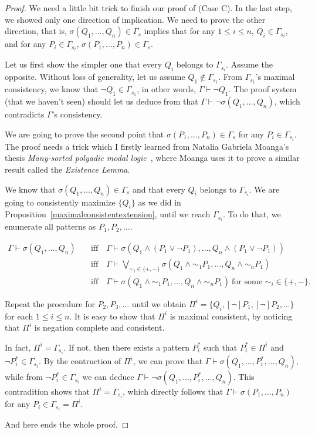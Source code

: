 \documentclass{article}
\theoremstyle{plain}
\begin{document}
\begin{proof}
We need a little bit trick to finish our proof of (Case C). In the last step, we showed only one direction of implication. We need to prove the other direction, that is, $\sigma(Q_1,\dots,Q_n) \in \Gamma_s$ implies that for any $1 \le i \le n$, $Q_i \in \Gamma_{s_i}$, and for any $P_i \in \Gamma_{s_i}$, $\sigma(P_1, \dots, P_n) \in \Gamma_s$.

Let us first show the simpler one that every $Q_i$ belongs to $\Gamma_{s_i}$. Assume the opposite. Without loss of generality, let us assume $Q_1 \not \in \Gamma_{s_1}$. From $\Gamma_{s_1}$'s maximal consistency, we know that $\neg Q_1 \in \Gamma_{s_1}$, in other words, $\Gamma \vdash \neg Q_1$. The proof system (that we haven't seen) should let us deduce from that $\Gamma \vdash \neg \sigma(Q_1,\dots, Q_n)$, which contradicts $\Gamma$'s consistency.

We are going to prove the second point that $\sigma(P_1,\dots,P_n) \in \Gamma_s$ for any $P_i \in \Gamma_{s_i}$. The proof needs a trick which I firstly learned from Natalia Gabriela Moanga's thesis \emph{Many-sorted polyadic modal logic}~\cite{}, where Moanga uses it to prove a similar result called the \emph{Existence Lemma}.

We know that $\sigma(Q_1,\dots,Q_n) \in \Gamma_s$ and that every $Q_i$ belongs to $\Gamma_{s_i}$. We are going to consistently maximize $\{Q_i\}$ as we did in Proposition~\ref{maximalconsistentextension}, until we reach $\Gamma_{s_i}$. To do that, we enumerate all patterns as $P_1, P_2, \dots$. 

\begin{align*}
\Gamma \vdash \sigma(Q_1,\dots,Q_n) \quad
&\text{iff} \quad \Gamma \vdash \sigma(Q_1 \wedge (P_1 \vee \neg P_1), \dots, Q_n \wedge (P_1 \vee \neg P_1)) \\
&\text{iff} \quad \Gamma \vdash \bigvee_{\sim_i \in \{+, -\}} \sigma(Q_1 \wedge \sim_1 P_1, \dots, Q_n \wedge \sim_n P_1) \\
&\text{iff} \quad \Gamma \vdash \sigma(Q_1 \wedge \sim_1 P_1, \dots, Q_n \wedge \sim_n P_1) \ \text{for some $\sim_i \in \{+, -\}$}.
\end{align*}

Repeat the procedure for $P_2, P_3, \dots$ until we obtain $\Pi^i = \{Q_i, [\neg]P_1, [\neg]P_2, \dots\}$ for each $1 \le i \le n$. It is easy to show that $\Pi^i$ is maximal consistent, by noticing that $\Pi^i$ is negation complete and consistent. 

In fact, $\Pi^i = \Gamma_{s_i}$. If not, then there exists a pattern $P_i^*$ such that $P_i^* \in \Pi^i$ and $\neg P_i^* \in \Gamma_{s_i}$. By the contruction of $\Pi^i$, we can prove that $\Gamma \vdash \sigma(Q_1,\dots,P_i^*,\dots,Q_n)$, while from $\neg P_i^* \in \Gamma_{s_i}$ we can deduce $\Gamma \vdash \neg \sigma(Q_1,\dots,P_i^*,\dots,Q_n)$. This contradition shows that $\Pi^i = \Gamma_{s_i}$, which directly follows that $\Gamma \vdash \sigma(P_1,\dots,P_n)$ for any $P_i \in \Gamma_{s_i} = \Pi^i$.

And here ends the whole proof.

\end{proof}
\end{document}
